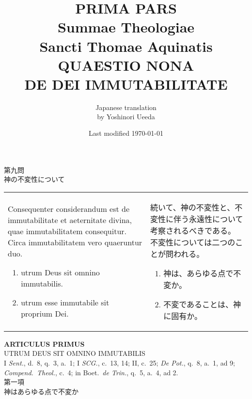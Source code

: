 \documentclass[10pt]{jsarticle} %
\title{{\bf PRIMA PARS}\\{\HUGE Summae Theologiae}\\Sancti Thomae
Aquinatis\\{\sffamily QUAESTIO NONA}\\DE DEI IMMUTABILITATE}
\author{Japanese translation\\by Yoshinori {\sc Ueeda}}
\date{Last modified \today}
\begin{document}
\maketitle

\begin{center}
 {\Large 第九問\\神の不変性について}
\end{center}

\begin{longtable}{p{21em}p{21em}}
Consequenter considerandum est de immutabilitate et aeternitate
divina, quae immutabilitatem consequitur. Circa immutabilitatem vero
quaeruntur duo.
\begin{enumerate}
 \item utrum Deus sit omnino immutabilis. 
 \item utrum esse immutabile sit proprium Dei.
\end{enumerate}

 &

 続いて、神の不変性と、不変性に伴う永遠性について考察されるべきである。
 不変性については二つのことが問われる。

\begin{enumerate}
\item 神は、あらゆる点で不変か。
\item 不変であることは、神に固有か。
\end{enumerate}
\end{longtable}
\newpage
{}
\begin{center}
 {\Large {\bf ARTICULUS PRIMUS}}\\
 {\large UTRUM DEUS SIT OMNINO IMMUTABILIS}\\
 {\footnotesize I {\itshape Sent.}, d.~8, q.~3, a.~1; I {\itshape SCG.},
 c.~13, 14; II, c.~25; {\itshape De Pot.}, q.~8, a.~1, ad 9; {\itshape
 Compend.~Theol.}, c.~4; in Boet.~{\itshape de Trin.}, q.~5, a.~4, ad 2.}\\
 {\Large 第一項\\神はあらゆる点で不変か}
\end{center}
\end{document}
